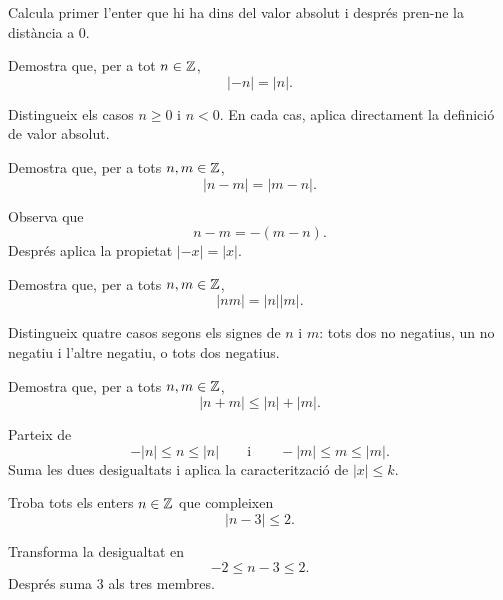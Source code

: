 \begin{indicacio}
Calcula primer l'enter que hi ha dins del valor absolut i després pren-ne la distància a \(0\).
\end{indicacio}


\begin{exercici}
Demostra que, per a tot \(n\in\mathbb{Z}\),
\[
|-n|=|n|.
\]
\end{exercici}

\begin{indicacio}
Distingueix els casos \(n\geq0\) i \(n<0\). En cada cas, aplica directament la definició de valor absolut.
\end{indicacio}


\begin{exercici}
Demostra que, per a tots \(n,m\in\mathbb{Z}\),
\[
|n-m|=|m-n|.
\]
\end{exercici}

\begin{indicacio}
Observa que
\[
n-m=-(m-n).
\]
Després aplica la propietat \(|-x|=|x|\).
\end{indicacio}


\begin{exercici}
Demostra que, per a tots \(n,m\in\mathbb{Z}\),
\[
|nm|=|n||m|.
\]
\end{exercici}

\begin{indicacio}
Distingueix quatre casos segons els signes de \(n\) i \(m\): tots dos no negatius, un no negatiu i l'altre negatiu, o tots dos negatius.
\end{indicacio}


\begin{exercici}
Demostra que, per a tots \(n,m\in\mathbb{Z}\),
\[
|n+m|\leq |n|+|m|.
\]
\end{exercici}

\begin{indicacio}
Parteix de
\[
-|n|\leq n\leq |n|
\qquad\text{i}\qquad
-|m|\leq m\leq |m|.
\]
Suma les dues desigualtats i aplica la caracterització de \(|x|\leq k\).
\end{indicacio}


\begin{exercici}
Troba tots els enters \(n\in\mathbb{Z}\) que compleixen
\[
|n-3|\leq2.
\]
\end{exercici}

\begin{indicacio}
Transforma la desigualtat en
\[
-2\leq n-3\leq2.
\]
Després suma \(3\) als tres membres.
\end{indicacio}


